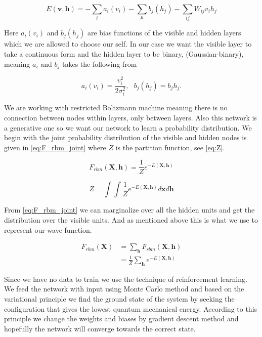 \begin{equation}\label{eq:E_rbm}
E(\mathbf{v}, \mathbf{h}) = - \sum_{i} a_i(v_i) - \sum_{\mu} b_j(h_j) - \sum_{ij} W_{ij}v_i h_j 
\end{equation}

Here $a_i(v_i)$ and $b_j(h_j)$ are bias functions of the visible and hidden layers which we are allowed to choose our self. In our case we want the visible layer to take a continuous form and the hidden layer to be binary, (Gaussian-binary), meaning $a_i$ and $b_j$ takes the following from

$$a_i(v_i) = \frac{v_i^2}{2 \sigma_i^2}, \ \ \ b_j(h_j)= b_jh_j.$$

We are working with restricted Boltzmann machine meaning there is no connection between nodes within layers, only between layers. Also this network is a generative one so we want our network to learn a probability distribution. We begin with the joint probability distribution of the visible and hidden nodes is given in \eqref{eq:F_rbm_joint} where $Z$ is the partition function, see \eqref{eq:Z}. 

\begin{equation}\label{eq:F_rbm_joint}
F_{rbm} (\mathbf{X}, \mathbf{h}) = \frac{1}{Z} e^{-E(\mathbf{X}, \mathbf{h})}
\end{equation}

\begin{equation}\label{eq:Z}
Z = \int \int \frac{1}{Z} e^{-E(\mathbf{X}, \mathbf{h})} d\mathbf{x}d\mathbf{h}
\end{equation}

From \eqref{eq:F_rbm_joint} we can marginalize over all the hidden units and get the distribution over the visible units. And as mentioned above this is what we use to represent our wave function. 

\begin{align}\label{eq:F_rbm_marg}
F_{rbm} (\mathbf{X}) &= \sum_{\mathbf{h}} F_{rbm} (\mathbf{X}, \mathbf{h}) \\
&= \frac{1}{Z} \sum_{\mathbf{h}} e^{-E(\mathbf{X}, \mathbf{h})}
\end{align}

Since we have no data to train we use the technique of reinforcement learning. We feed the network with input using Monte Carlo method and based on the variational principle we find the ground state of the system by seeking the configuration that gives the lowest quantum mechanical energy. According to this principle we change the weights and biases by gradient descent method and hopefully the network will converge towards the correct state.  

